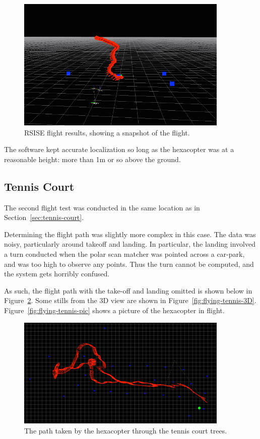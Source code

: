 \documentclass[12pt,oneside,a4paper,draft]{book}
\begin{document}
\begin{figure}
  \centering
  \includegraphics[width=0.9\textwidth]{figs/rsise-flying-results}
  \caption{RSISE flight results, showing a snapshot of the
    flight.}
  \label{fig:rsise-results}
\end{figure}

The software kept accurate localization so long as the hexacopter was
at a reasonable height: more than 1m or so above the ground.

\newpage
\subsection{Tennis Court}
\label{sec:tennis-court-1}

The second flight test was conducted in the same location as in
Section~\ref{sec:tennis-court}. 

Determining the flight path was slightly more complex in this
case. The data was noisy, particularly around takeoff and landing. In
particular, the landing involved a turn conducted when the polar scan
matcher was pointed across a car-park, and was too high to observe any
points. Thus the turn cannot be computed, and the system gets horribly
confused.

As such, the flight path with the take-off and landing omitted is
shown below in Figure~\ref{fig:flying-tennis-path}. Some stills from
the 3D view are shown in
Figure~\ref{fig:flying-tennis-3D}. Figure~\ref{fig:flying-tennis-pic}
shows a picture of the hexacopter in flight.

\begin{figure}[h]
  \centering
  \includegraphics[width=0.9\textwidth]{figs/tennis-flying-results}
  \caption{The path taken by the hexacopter through the tennis court trees.}
  \label{fig:flying-tennis-path}
\end{figure}
\end{document}
